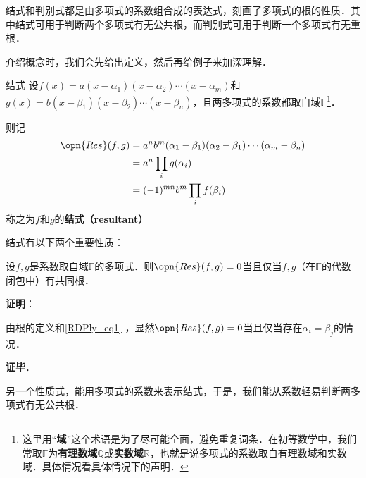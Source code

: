 

结式和判别式都是由多项式的系数组合成的表达式，刻画了多项式的根的性质．其中结式可用于判断两个多项式有无公共根，而判别式可用于判断一个多项式有无重根．

介绍概念时，我们会先给出定义，然后再给例子来加深理解．

\begin{definition}{结式}
设$f(x)=a(x-\alpha_1)(x-\alpha_2)\cdots(x-\alpha_m)$和$g(x)=b(x-\beta_1)(x-\beta_2)\cdots(x-\beta_n)$，且两多项式的系数都取自域$\mathbb{F}$\footnote{这里用“\textbf{域}”这个术语是为了尽可能全面，避免重复词条．在初等数学中，我们常取$\mathbb{F}$为\textbf{有理数域}$\mathbb{Q}$或\textbf{实数域}$\mathbb{R}$，也就是说多项式的系数取自有理数域和实数域．具体情况看具体情况下的声明．}．

则记
\begin{equation}\label{RDPly_eq1}
\begin{aligned}
\opn{Res}(f, g)&=a^nb^m(\alpha_1-\beta_1)(\alpha_2-\beta_1)\cdots(\alpha_m-\beta_n)\\
&=a^n\prod_{i} g(\alpha_i)\\
&=(-1)^{mn}b^m\prod_{i} f(\beta_i)
\end{aligned}
\end{equation}
称之为$f$和$g$的\textbf{结式（resultant）}

\end{definition}

结式有以下两个重要性质：

\begin{theorem}{}
设$f, g$是系数取自域$\mathbb{F}$的多项式．则$\opn{Res}(f, g)=0$当且仅当$f, g$（在$\mathbb{F}$的代数闭包中）有共同根．
\end{theorem}

\textbf{证明}：

由根的定义和\autoref{RDPly_eq1} ，显然$\opn{Res}(f, g)=0$当且仅当存在$\alpha_i=\beta_j$的情况．

\textbf{证毕}．


另一个性质式，能用多项式的系数来表示结式，于是，我们能从系数轻易判断两多项式有无公共根．



\begin{theorem}{}

\end{theorem}




















